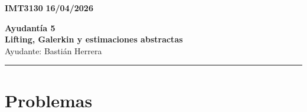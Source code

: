 \documentclass[11pt]{article}
\theoremstyle{thmstyle}
\begin{document}
    \begin{flushleft}
        \small
        \vspace{1pt}
        \textbf{IMT3130} \hfill
        \textbf{16/04/2026}
    \end{flushleft}
    \begin{center}
        \LARGE\textbf{Ayudant\'ia 5}\\
        \vspace{3pt}
        \normalsize\textbf{Lifting, Galerkin y estimaciones abstractas}\\
        \normalsize Ayudante: Basti\'an Herrera 
        \rule{\textwidth}{0.05mm}
    \end{center}

\section*{Problemas}
\end{document}
